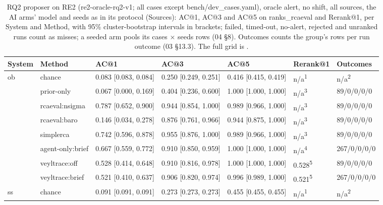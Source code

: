 \begin{table}[t]
\centering
\caption{RQ2 proposer on RE2 (re2-oracle-rq2-v1; all cases except bench/dev\_cases.yaml), oracle alert, no shift, all sources, the AI arms' model and seeds as in its protocol (Sources): AC@1, AC@3 and AC@5 on ranks\_rcaeval and Rerank@1, per System and Method, with 95\% cluster-bootstrap intervals in brackets; failed, timed-out, no-alert, rejected and unranked runs count as misses; a seeded arm pools its cases $\times$ seeds rows (04 \S{}8). Outcomes counts the group's rows per run outcome (03 \S{}13.3). The full grid is .}
\label{tab:t06-rq2-re2-oracle-rq2-v1-paper}
\footnotesize
\setlength{\tabcolsep}{3pt}%
\begin{tabular}{@{}lllllll@{}}
\hline
System & Method & AC@1 & AC@3 & AC@5 & Rerank@1 & Outcomes \\
\hline
ob & chance & 0.083 [0.083, 0.084] & 0.250 [0.249, 0.251] & 0.416 [0.415, 0.419] & n/a\textsuperscript{1} & n/a\textsuperscript{2} \\
 & prior-only & 0.067 [0.000, 0.169] & 0.404 [0.236, 0.600] & 1.000 [1.000, 1.000] & n/a\textsuperscript{3} & 89/0/0/0/0 \\
 & rcaeval:nsigma & 0.787 [0.652, 0.900] & 0.944 [0.854, 1.000] & 0.989 [0.966, 1.000] & n/a\textsuperscript{3} & 89/0/0/0/0 \\
 & rcaeval:baro & 0.146 [0.034, 0.278] & 0.876 [0.761, 0.966] & 0.944 [0.875, 1.000] & n/a\textsuperscript{3} & 89/0/0/0/0 \\
 & simplerca & 0.742 [0.596, 0.878] & 0.955 [0.876, 1.000] & 0.989 [0.966, 1.000] & n/a\textsuperscript{3} & 89/0/0/0/0 \\
 & agent-only:brief & 0.667 [0.559, 0.772] & 0.910 [0.850, 0.959] & 1.000 [1.000, 1.000] & n/a\textsuperscript{4} & 267/0/0/0/0 \\
 & veyltrace:off & 0.528 [0.414, 0.648] & 0.910 [0.816, 0.978] & 1.000 [1.000, 1.000] & 0.528\textsuperscript{5} & 89/0/0/0/0 \\
 & veyltrace:brief & 0.521 [0.410, 0.637] & 0.906 [0.820, 0.974] & 0.996 [0.989, 1.000] & 0.521\textsuperscript{5} & 267/0/0/0/0 \\
ss & chance & 0.091 [0.091, 0.091] & 0.273 [0.273, 0.273] & 0.455 [0.455, 0.455] & n/a\textsuperscript{1} & n/a\textsuperscript{2} \\

\end{tabular}
\end{table}
